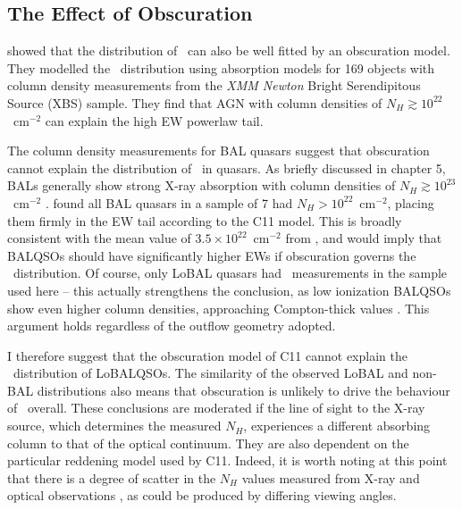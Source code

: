 \subsection{The Effect of Obscuration}
\label{sec:obscure}

\citet[][hereafter C11]{caccianiga2011} showed that the distribution of \ewo\
can also be well fitted by an obscuration model. They modelled the 
\ewo\ distribution using absorption models for 169 objects with column density
measurements from the {\sl XMM Newton} Bright Serendipitous Source (XBS)
sample. They find that AGN with column densities of 
$N_H\gtrsim10^{22}$~cm$^{-2}$ can explain the high EW powerlaw tail. 

The column density measurements for BAL quasars suggest that obscuration 
cannot explain the distribution of \ewo\ in quasars. 
As briefly discussed in chapter 5, BALs generally show
strong X-ray absorption with column densities of $N_H\gtrsim10^{23}$~cm$^{-2}$
\citep{green1996,mathur2000,green2001,grupemathur2003}. \cite{gallagher1999}
found all BAL quasars in a sample of 7 had $N_H>10^{22}$~cm$^{-2}$, placing
them firmly in the EW tail according to the C11 model. This is broadly
consistent with the mean value of $3.5\times10^{22}$~cm$^{-2}$ from
\cite{morabito2013}, and would imply that BALQSOs should have significantly
higher EWs if obscuration governs the \ewo\ distribution.
Of course, only LoBAL quasars had \ewo\ measurements 
in the sample used here -- this actually strengthens the conclusion, as low ionization 
BALQSOs show even higher column densities, approaching Compton-thick values 
\citep{morabito2011}. This argument holds regardless of the outflow geometry adopted.

I therefore suggest that the obscuration model of C11 cannot explain the \ewo\ distribution
of LoBALQSOs. The similarity of the observed LoBAL and non-BAL distributions
also means that obscuration is unlikely to drive the behaviour of \ewo\ overall.
These conclusions are moderated if the line of sight to the X-ray source, which determines 
the measured $N_H$, experiences a different absorbing column to that of the optical continuum.
They are also dependent on the particular reddening model used by C11. Indeed, it is worth noting at 
this point that there is a degree of scatter in the $N_H$ values measured from X-ray and optical
observations \citep{maiolino2001b,maiolino2001a}, as could be produced by differing 
viewing angles.


